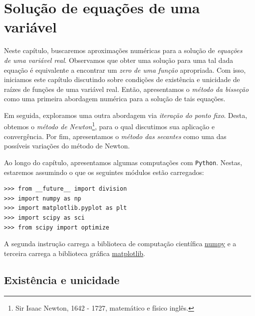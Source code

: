 
%

\chapter{Solução de equações de uma variável}

Neste capítulo, buscaremos aproximações numéricas para a solução de \emph{equações de uma variável real}. Observamos que obter uma solução para uma tal dada equação é equivalente a encontrar um \emph{zero de uma função} apropriada. Com isso, iniciamos este capítulo discutindo sobre condições de existência e unicidade de raízes de funções de uma variável real. Então, apresentamos o \emph{método da bisseção} como uma primeira abordagem numérica para a solução de tais equações.

Em seguida, exploramos uma outra abordagem via \emph{iteração do ponto fixo}. Desta, obtemos o \emph{método de Newton}\footnote{Sir Isaac Newton, 1642 - 1727, matemático e físico inglês.}, para o qual discutimos sua aplicação e convergência. Por fim, apresentamos o \emph{método das secantes} como uma das possíveis variações do método de Newton.

\ifispython
Ao longo do capítulo, apresentamos algumas computações com \verb+Python+. Nestas, estaremos assumindo o que os seguintes módulos estão carregados:
\begin{verbatim}
>>> from __future__ import division
>>> import numpy as np
>>> import matplotlib.pyplot as plt
>>> import scipy as sci
>>> from scipy import optimize
\end{verbatim}
A segunda instrução carrega a biblioteca de computação científica \href{http://www.numpy.org/}{numpy} e a terceira carrega a biblioteca gráfica \href{http://matplotlib.org/}{matplotlib}.
\fi

\section{Existência e unicidade}

